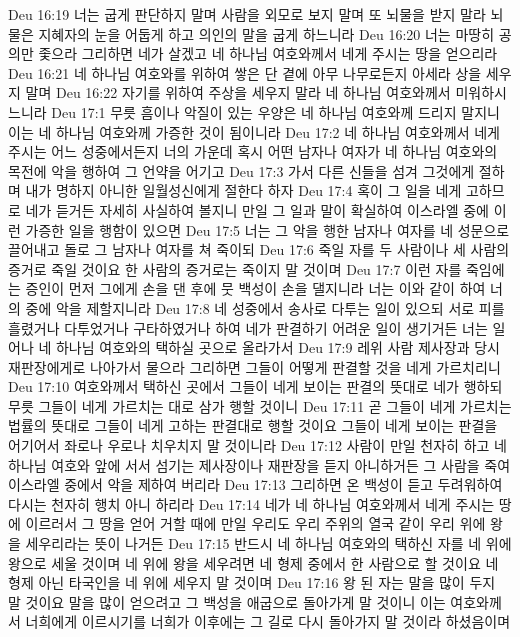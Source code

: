 Deu 16:19  너는 굽게 판단하지 말며 사람을 외모로 보지 말며 또 뇌물을 받지 말라 뇌물은 지혜자의 눈을 어둡게 하고 의인의 말을 굽게 하느니라
Deu 16:20  너는 마땅히 공의만 좇으라 그리하면 네가 살겠고 네 하나님 여호와께서 네게 주시는 땅을 얻으리라
Deu 16:21  네 하나님 여호와를 위하여 쌓은 단 곁에 아무 나무로든지 아세라 상을 세우지 말며
Deu 16:22  자기를 위하여 주상을 세우지 말라 네 하나님 여호와께서 미워하시느니라
Deu 17:1  무릇 흠이나 악질이 있는 우양은 네 하나님 여호와께 드리지 말지니 이는 네 하나님 여호와께 가증한 것이 됨이니라
Deu 17:2  네 하나님 여호와께서 네게 주시는 어느 성중에서든지 너의 가운데 혹시 어떤 남자나 여자가 네 하나님 여호와의 목전에 악을 행하여 그 언약을 어기고
Deu 17:3  가서 다른 신들을 섬겨 그것에게 절하며 내가 명하지 아니한 일월성신에게 절한다 하자
Deu 17:4  혹이 그 일을 네게 고하므로 네가 듣거든 자세히 사실하여 볼지니 만일 그 일과 말이 확실하여 이스라엘 중에 이런 가증한 일을 행함이 있으면
Deu 17:5  너는 그 악을 행한 남자나 여자를 네 성문으로 끌어내고 돌로 그 남자나 여자를 쳐 죽이되
Deu 17:6  죽일 자를 두 사람이나 세 사람의 증거로 죽일 것이요 한 사람의 증거로는 죽이지 말 것이며
Deu 17:7  이런 자를 죽임에는 증인이 먼저 그에게 손을 댄 후에 뭇 백성이 손을 댈지니라 너는 이와 같이 하여 너의 중에 악을 제할지니라
Deu 17:8  네 성중에서 송사로 다투는 일이 있으되 서로 피를 흘렸거나 다투었거나 구타하였거나 하여 네가 판결하기 어려운 일이 생기거든 너는 일어나 네 하나님 여호와의 택하실 곳으로 올라가서
Deu 17:9  레위 사람 제사장과 당시 재판장에게로 나아가서 물으라 그리하면 그들이 어떻게 판결할 것을 네게 가르치리니
Deu 17:10  여호와께서 택하신 곳에서 그들이 네게 보이는 판결의 뜻대로 네가 행하되 무릇 그들이 네게 가르치는 대로 삼가 행할 것이니
Deu 17:11  곧 그들이 네게 가르치는 법률의 뜻대로 그들이 네게 고하는 판결대로 행할 것이요 그들이 네게 보이는 판결을 어기어서 좌로나 우로나 치우치지 말 것이니라
Deu 17:12  사람이 만일 천자히 하고 네 하나님 여호와 앞에 서서 섬기는 제사장이나 재판장을 듣지 아니하거든 그 사람을 죽여 이스라엘 중에서 악을 제하여 버리라
Deu 17:13  그리하면 온 백성이 듣고 두려워하여 다시는 천자히 행치 아니 하리라
Deu 17:14  네가 네 하나님 여호와께서 네게 주시는 땅에 이르러서 그 땅을 얻어 거할 때에 만일 우리도 우리 주위의 열국 같이 우리 위에 왕을 세우리라는 뜻이 나거든
Deu 17:15  반드시 네 하나님 여호와의 택하신 자를 네 위에 왕으로 세울 것이며 네 위에 왕을 세우려면 네 형제 중에서 한 사람으로 할 것이요 네 형제 아닌 타국인을 네 위에 세우지 말 것이며
Deu 17:16  왕 된 자는 말을 많이 두지 말 것이요 말을 많이 얻으려고 그 백성을 애굽으로 돌아가게 말 것이니 이는 여호와께서 너희에게 이르시기를 너희가 이후에는 그 길로 다시 돌아가지 말 것이라 하셨음이며
